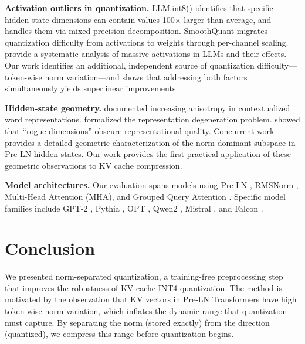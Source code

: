 \documentclass[11pt]{article}
\begin{document}
\textbf{Activation outliers in quantization.}
LLM.int8() \citep{dettmers2022llm} identifies that specific hidden-state dimensions can contain values 100$\times$ larger than average, and handles them via mixed-precision decomposition. SmoothQuant \citep{xiao2023smoothquant} migrates quantization difficulty from activations to weights through per-channel scaling. \citet{sun2024massive} provide a systematic analysis of massive activations in LLMs and their effects. Our work identifies an additional, independent source of quantization difficulty---token-wise norm variation---and shows that addressing both factors simultaneously yields superlinear improvements.

\textbf{Hidden-state geometry.}
\citet{ethayarajh2019contextual} documented increasing anisotropy in contextualized word representations. \citet{gao2019representation} formalized the representation degeneration problem. \citet{timkey2021bark} showed that ``rogue dimensions'' obscure representational quality. Concurrent work \citep{sato2026arc} provides a detailed geometric characterization of the norm-dominant subspace in Pre-LN hidden states. Our work provides the first practical application of these geometric observations to KV cache compression.

\textbf{Model architectures.}
Our evaluation spans models using Pre-LN \citep{xiong2020layer}, RMSNorm \citep{zhang2019root}, Multi-Head Attention (MHA), and Grouped Query Attention \citep[GQA;][]{ainslie2023gqa}. Specific model families include GPT-2 \citep{radford2019language}, Pythia \citep{biderman2023pythia}, OPT \citep{zhang2022opt}, Qwen2 \citep{yang2024qwen2}, Mistral \citep{jiang2023mistral}, and Falcon \citep{almazrouei2023falcon}.

\section{Conclusion}

We presented norm-separated quantization, a training-free preprocessing step that improves the robustness of KV cache INT4 quantization. The method is motivated by the observation that KV vectors in Pre-LN Transformers have high token-wise norm variation, which inflates the dynamic range that quantization must capture. By separating the norm (stored exactly) from the direction (quantized), we compress this range before quantization begins.
\end{document}
